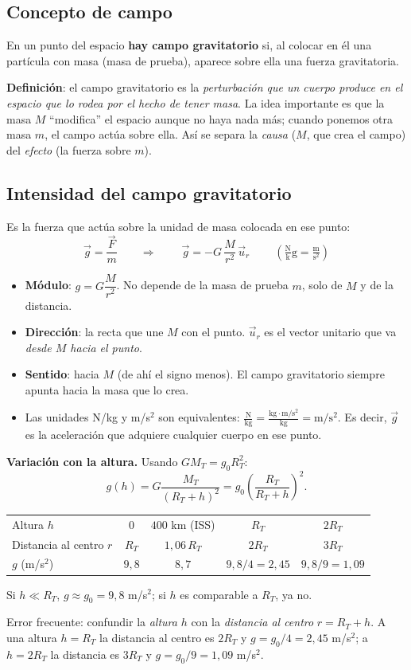 \documentclass[11pt,a4paper]{article}
\newcommand{\ur}{\vec{u}_r}
\begin{document}
\subsection{Concepto de campo}
En un punto del espacio \textbf{hay campo gravitatorio} si, al colocar en él una partícula con masa (masa de prueba), aparece sobre ella una fuerza gravitatoria. 

\textbf{Definición}: el campo gravitatorio es la \emph{perturbación que un cuerpo produce en el espacio que lo rodea por el hecho de tener masa}. La idea importante es que la masa $M$ ``modifica'' el espacio aunque no haya nada más; cuando ponemos otra masa $m$, el campo actúa sobre ella. Así se separa la \emph{causa} ($M$, que crea el campo) del \emph{efecto} (la fuerza sobre $m$).

\subsection{Intensidad del campo gravitatorio}
Es la fuerza que actúa sobre la unidad de masa colocada en ese punto:
\[
\vec g=\frac{\vec F}{m}\qquad\Longrightarrow\qquad\boxed{\ \vec g=-G\,\frac{M}{r^2}\,\ur\ }\qquad\left(\mathrm{\tfrac Nkg}=\mathrm{\tfrac m{s^2}}\right)
\]
\begin{itemize}[itemsep=2pt]
  \item \textbf{Módulo}: $g=G\dfrac{M}{r^2}$. No depende de la masa de prueba $m$, solo de $M$ y de la distancia.
  \item \textbf{Dirección}: la recta que une $M$ con el punto. $\ur$ es el vector unitario que va \emph{desde $M$ hacia el punto}.
  \item \textbf{Sentido}: hacia $M$ (de ahí el signo menos). El campo gravitatorio siempre apunta hacia la masa que lo crea.
  \item Las unidades N/kg y m/s$^2$ son equivalentes: $\frac{\mathrm N}{\mathrm{kg}}=\frac{\mathrm{kg\cdot m/s^2}}{\mathrm{kg}}=\mathrm{m/s^2}$. Es decir, $\vec g$ es la aceleración que adquiere cualquier cuerpo en ese punto.
\end{itemize}

\textbf{Variación con la altura.} Usando $GM_T=g_0R_T^2$:
\[
g(h)=G\frac{M_T}{(R_T+h)^2}=g_0\left(\frac{R_T}{R_T+h}\right)^2 .
\]
\begin{center}
\begin{tabular}{lcccc}
\toprule
Altura $h$ & $0$ & $400$ km (ISS) & $R_T$ & $2R_T$\\
Distancia al centro $r$ & $R_T$ & $1{,}06\,R_T$ & $2R_T$ & $3R_T$\\
$g$ (m/s$^2$) & $9{,}8$ & $8{,}7$ & $9{,}8/4=2{,}45$ & $9{,}8/9=1{,}09$\\
\bottomrule
\end{tabular}
\end{center}
Si $h\ll R_T$, $g\approx g_0=9{,}8$ m/s$^2$; si $h$ es comparable a $R_T$, ya no.
\begin{ojo}
Error frecuente: confundir la \emph{altura} $h$ con la \emph{distancia al centro} $r=R_T+h$. A una altura $h=R_T$ la distancia al centro es $2R_T$ y $g=g_0/4=2{,}45$ m/s$^2$; a $h=2R_T$ la distancia es $3R_T$ y $g=g_0/9=1{,}09$ m/s$^2$.
\end{ojo}
\end{document}
